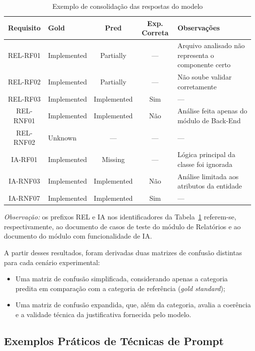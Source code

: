 \begin{table}[H]
\centering
\caption{Exemplo de consolidação das respostas do modelo}
\label{tab:exemplo-resultados}
\begin{tabular}{|c|l|c|c|p{5.5cm}|}
\hline
\textbf{Requisito} & \textbf{Gold} & \textbf{Pred} & \textbf{Exp. Correta} & \textbf{Observações} \\
\hline
REL-RF01  & Implemented & Partially   & --- & Arquivo analisado não representa o componente certo \\
REL-RF02  & Implemented & Partially   & --- & Não soube validar corretamente \\
\hline
REL-RF03  & Implemented & Implemented & Sim & --- \\
REL-RNF01 & Implemented & Implemented & Não & Análise feita apenas do módulo de Back-End \\
\hline
REL-RNF02 & Unknown     & ---         & --- & --- \\
IA-RF01   & Implemented & Missing     & --- & Lógica principal da classe foi ignorada \\
\hline
IA-RNF03  & Implemented & Implemented & Não & Análise limitada aos atributos da entidade \\
IA-RNF07  & Implemented & Implemented & Sim & --- \\
\hline
\end{tabular}
\end{table}

\noindent\textit{Observação:} os prefixos REL e IA nos identificadores da Tabela~\ref{tab:exemplo-resultados} referem-se, respectivamente, ao documento de casos de teste do módulo de Relatórios e ao documento do módulo com funcionalidade de IA.

A partir desses resultados, foram derivadas duas matrizes de confusão distintas para cada cenário experimental: 
\begin{itemize}
    \item Uma matriz de confusão simplificada, considerando apenas a categoria predita em comparação com a categoria de referência (\textit{gold standard}); 
    \item Uma matriz de confusão expandida, que, além da categoria, avalia a coerência e a validade técnica da justificativa fornecida pelo modelo. 
\end{itemize}

\subsection{Exemplos Práticos de Técnicas de Prompt}

